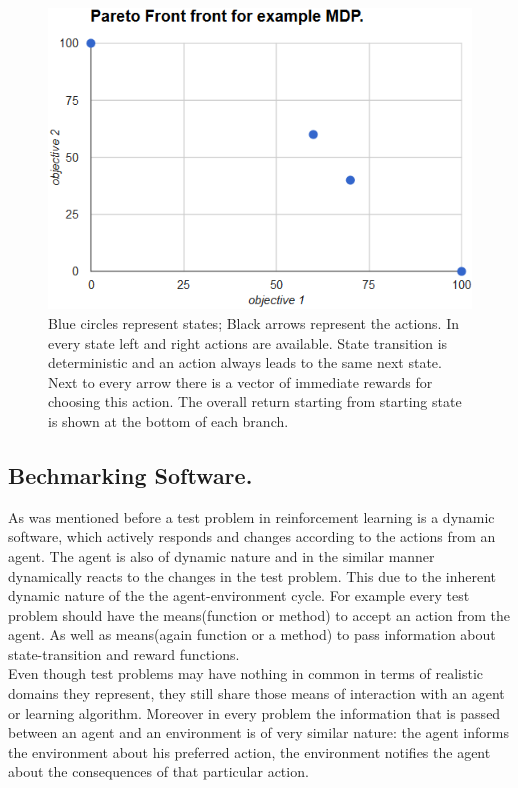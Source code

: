 \begin{figure}[ht]
\centering
\includegraphics[scale=0.6]{exampleMDPFront.png}
\caption{Blue circles represent states; Black arrows represent the actions. In every state left and right actions are available. State transition is deterministic and an action always leads to the same next state. Next to every arrow there is a vector of immediate rewards for choosing this action. The overall return starting from starting state is shown at the bottom of each branch.}
\label{fig:exampleMDPFront}
\end{figure}

\subsection{Bechmarking Software.}
As was mentioned before a test problem in reinforcement learning is a dynamic software, which actively responds and changes according to the actions from an agent. The agent is also of dynamic nature and in the similar manner dynamically reacts to the changes in the test problem. This due to the inherent dynamic nature of the the agent-environment cycle. For example every test problem should have the means(function or method) to accept an action from the agent. As well as means(again function or a method) to pass information about state-transition and reward functions. \\

Even though test problems may have nothing in common in terms of realistic domains they represent, they still share those means of interaction with an agent or learning algorithm. Moreover in every problem the information that is passed between an agent and an environment is of very similar nature: the agent informs the environment about his preferred action, the environment notifies the agent about the consequences of that particular action. \\

